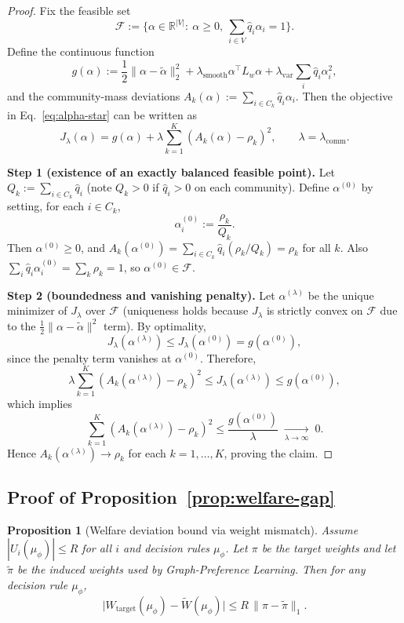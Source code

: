 \documentclass{article}
\newtheorem*{proposition*}{Proposition}
\theoremstyle{plain}
\theoremstyle{definition}
\theoremstyle{remark}
\begin{document}
\begin{proof}
Fix the feasible set
\[
\mathcal{F}:=\{\alpha\in\mathbb{R}^{|V|}:\ \alpha\ge 0,\ \sum_{i\in V}\hat q_i\alpha_i=1\}.
\]
Define the continuous function
\[
g(\alpha):=
\frac{1}{2}\|\alpha-\tilde\alpha\|_2^2
+\lambda_{\mathrm{smooth}}\alpha^\top L_w\alpha
+\lambda_{\mathrm{var}}\sum_i \hat q_i\alpha_i^2,
\]
and the community-mass deviations
$A_k(\alpha):=\sum_{i\in C_k}\hat q_i\alpha_i$.
Then the objective in Eq.~\eqref{eq:alpha-star} can be written as
\[
J_\lambda(\alpha)=g(\alpha)+\lambda\sum_{k=1}^K (A_k(\alpha)-\rho_k)^2,
\qquad \lambda=\lambda_{\mathrm{comm}}.
\]

\textbf{Step 1 (existence of an exactly balanced feasible point).}
Let $Q_k:=\sum_{i\in C_k}\hat q_i$ (note $Q_k>0$ if $\hat q_i>0$ on each community).
Define $\alpha^{(0)}$ by setting, for each $i\in C_k$,
\[
\alpha_i^{(0)}:=\frac{\rho_k}{Q_k}.
\]
Then $\alpha^{(0)}\ge 0$, and
$A_k(\alpha^{(0)})=\sum_{i\in C_k}\hat q_i(\rho_k/Q_k)=\rho_k$ for all $k$.
Also $\sum_i \hat q_i\alpha_i^{(0)}=\sum_k \rho_k=1$, so $\alpha^{(0)}\in\mathcal{F}$.

\textbf{Step 2 (boundedness and vanishing penalty).}
Let $\alpha^{(\lambda)}$ be the unique minimizer of $J_\lambda$ over $\mathcal{F}$
(uniqueness holds because $J_\lambda$ is strictly convex on $\mathcal{F}$ due to
the $\frac12\|\alpha-\tilde\alpha\|^2$ term).
By optimality,
\[
J_\lambda(\alpha^{(\lambda)}) \le J_\lambda(\alpha^{(0)}) = g(\alpha^{(0)}),
\]
since the penalty term vanishes at $\alpha^{(0)}$.
Therefore,
\[
\lambda\sum_{k=1}^K (A_k(\alpha^{(\lambda)})-\rho_k)^2
\le J_\lambda(\alpha^{(\lambda)}) \le g(\alpha^{(0)}),
\]
which implies
\[
\sum_{k=1}^K (A_k(\alpha^{(\lambda)})-\rho_k)^2 \le \frac{g(\alpha^{(0)})}{\lambda}
\;\xrightarrow[\lambda\to\infty]{}\; 0.
\]
Hence $A_k(\alpha^{(\lambda)})\to \rho_k$ for each $k=1,\dots,K$, proving the claim.
\end{proof}

\subsection{Proof of Proposition~\ref{prop:welfare-gap}}
\label{app:proof-welfare-gap}

\begin{proposition*}[Welfare deviation bound via weight mismatch]
Assume $|U_i(\mu_\phi)| \le R$ for all $i$ and decision rules $\mu_\phi$. Let
$\pi$ be the target weights and let $\tilde\pi$ be the induced weights
used by Graph-Preference Learning. Then for any decision rule $\mu_\phi$,
\begin{equation}
    \big|
        W_{\text{target}}(\mu_\phi)
        -
        \widetilde{W}(\mu_\phi)
    \big|
    \le
    R \, \|\pi - \tilde\pi\|_1.
\end{equation}
\end{proposition*}
\end{document}
